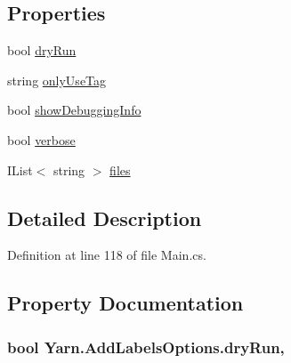 \subsection*{Properties}
\begin{DoxyCompactItemize}
\item 
bool \hyperlink{a00039_a5dc9d9db767738237e988f95fc0330f4}{dry\-Run}
\item 
string \hyperlink{a00039_ab6162338f9606a836f3101fe0e228249}{only\-Use\-Tag}
\item 
bool \hyperlink{a00043_a89964ea17bd19caf00cb5bff563ed01c}{show\-Debugging\-Info}
\item 
bool \hyperlink{a00043_ada4d83d1756918f362d55f6649b82b17}{verbose}
\item 
I\-List$<$ string $>$ \hyperlink{a00043_aa93cbb1bc1d5328e0a417012621e92d2}{files}
\end{DoxyCompactItemize}


\subsection{Detailed Description}


Definition at line 118 of file Main.\-cs.



\subsection{Property Documentation}
\hypertarget{a00039_a5dc9d9db767738237e988f95fc0330f4}{
\subsubsection[{dry\-Run}]{\setlength{\rightskip}{0pt plus 5cm}bool Yarn.\-Add\-Labels\-Options.\-dry\-Run\hspace{0.3cm}{\ttfamily [get]}, {\ttfamily [set]}}}\label{a00039_a5dc9d9db767738237e988f95fc0330f4}


